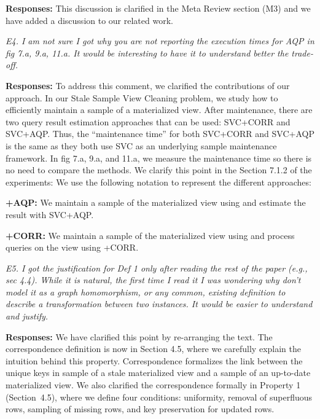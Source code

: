 \vspace{.25em}

{\bf Responses:} This discussion is clarified in the Meta Review section (M3) and we have added a discussion to our related work.

\vspace{1em}
\emph{E4. I am not sure I got why you are not reporting the execution times for AQP in fig 7.a, 9.a, 11.a. It would be interesting to have it to understand better the trade-off.}

\vspace{.25em}

{\bf Responses:} To address this comment, we clarified the contributions of our approach. In our Stale Sample View Cleaning problem, we study how to efficiently maintain a sample of a materialized view. After maintenance, there are two query result estimation approaches that can be used: SVC+CORR and SVC+AQP. Thus, the “maintenance time” for both SVC+CORR and SVC+AQP is the same as they both use SVC as an underlying sample maintenance framework.  In fig 7.a, 9.a, and 11.a, we measure the maintenance time so there is no need to compare the methods. We clarify this point in the Section 7.1.2 of the experiments:
We use the following notation to represent the different approaches:
\begin{displayquote}
\noindent\textbf{\svcnospace+AQP: } We maintain a sample of the materialized view using \svc and estimate the result with SVC+AQP.

\noindent\textbf{\svcnospace+CORR: } We maintain a sample of the materialized view using \svc and process queries on the view using \svcnospace+CORR.
\end{displayquote}

\vspace{1em}
\emph{E5. I got the justification for Def 1 only after reading the rest of the paper (e.g., sec 4.4). While it is natural, the first time I read it I was wondering why don't model it as a graph homomorphism, or any common, existing definition to describe a transformation between two instances. It would be easier to understand and justify.}

\vspace{.25em}

{\bf Responses:} We have clarified this point by re-arranging the text. The correspondence definition is now in Section 4.5, where we carefully explain the intuition behind this property. Correspondence formalizes the link between the unique keys in sample of a stale materialized view and a sample of an up-to-date materialized view. 
We also clarified the correspondence formally in Property 1 (Section~4.5), where we define four conditions: uniformity, removal of superfluous rows, sampling of missing rows, and key preservation for updated rows.

